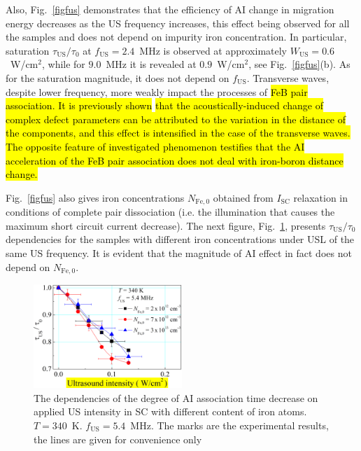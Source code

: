 \documentclass[sn-mathphys]{sn-jnl}%
\theoremstyle{thmstyleone}%
\theoremstyle{thmstyletwo}%
\theoremstyle{thmstylethree}%
\begin{document}
Also, Fig.~\ref{figfus} demonstrates that the efficiency of
AI change in migration energy decreases as the US frequency increases,
this effect being observed for all the samples and does not depend on impurity iron concentration.
In particular, saturation $\tau_\mathrm{US}/\tau_{0}$ at $f_\mathrm{US}=2.4$~MHz is observed
at approximately $W_\mathrm{US}=0.6$~W/cm$^2$,
while for $9.0$~MHz it is revealed at $0.9$~W/cm$^2$, see Fig.~\ref{figfus}(b).
As for the saturation magnitude, it does not depend on $f_\mathrm{US}$.
Transverse waves, despite lower frequency, more weakly impact the processes of \hl{FeB pair association.
It is previously shown} \cite{Olikh2018SM} \hl{that the acoustically-induced change of complex defect parameters can be attributed to the variation in the distance of the components, and this effect is intensified in the case of the transverse waves.
The opposite feature of investigated phenomenon testifies that the AI acceleration of the FeB pair
association does not deal with iron-boron distance change.}

Fig.~\ref{figfus} also gives iron concentrations $N_\mathrm{Fe,0}$ obtained from $I_\mathrm{SC}$ relaxation
in conditions of complete pair dissociation (i.e. the illumination that causes the maximum short circuit current decrease).
The next figure, Fig.~\ref{figNFe}, presents $\tau_\mathrm{US}/\tau_{0}$  dependencies
for the samples with different iron concentrations under USL of the same US frequency.
It is evident that the magnitude of AI effect in fact does not depend on $N_\mathrm{Fe,0}$.

\begin{figure}
\centering
 \includegraphics[width=0.5\textwidth]{Fig5}
\caption{
The dependencies of the degree of AI association time decrease on applied US intensity
in SC with different content of iron atoms.
$T=340$~K.
$f_\mathrm{US}=5.4$~MHz.
The marks are the experimental results, the lines are given for convenience only
}
\label{figNFe}       %
\end{figure}
\end{document}

